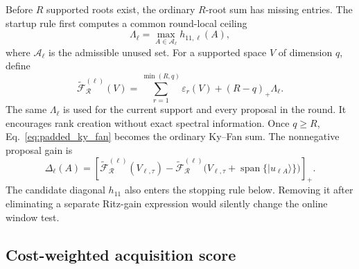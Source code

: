 \documentclass[
  reprint,
  amsmath,
  amssymb,
  aps,
  pra,
  nofootinbib,
  superscriptaddress,
  floatfix
]{revtex4-2}
\newcommand{\ket}[1]{|#1\rangle}
\newcommand{\spanop}{\operatorname{span}}
\newcommand{\mathcalR}{\mathcal{R}}
\begin{document}
Before $R$ supported roots exist, the ordinary $R$-root sum has missing
entries.  The startup rule first computes a common round-local ceiling
\begin{equation}
 \Lambda_\ell=\max_{A\in\mathcal A_\ell}h_{11,\ell}(A),
 \label{eq:rank_filling_ceiling}
\end{equation}
where $\mathcal A_\ell$ is the admissible unused set.  For a supported space
$V$ of dimension $q$, define
\begin{equation}
 \widetilde{\mathcal F}_{\mathcalR}^{(\ell)}(V)
 =\sum_{r=1}^{\min(R,q)}\varepsilon_r(V)
 +(R-q)_+\Lambda_\ell.
 \label{eq:padded_ky_fan}
\end{equation}
The same $\Lambda_\ell$ is used for the current support and every proposal in
the round.  It encourages rank creation without exact spectral information.
Once $q\geq R$, Eq.~\eqref{eq:padded_ky_fan} becomes the ordinary Ky--Fan
sum.  The nonnegative proposal gain is
\begin{equation}
 \Delta_\ell(A)=\left[
 \widetilde{\mathcal F}_{\mathcalR}^{(\ell)}(V_{\ell,\tau})
 -\widetilde{\mathcal F}_{\mathcalR}^{(\ell)}
 \bigl(V_{\ell,\tau}+\spanop\{\ket{u_{\ell A}}\}\bigr)
 \right]_+.
 \label{eq:proposed_pencil_gain}
\end{equation}
The candidate diagonal $h_{11}$ also enters the stopping rule below.  Removing
it after eliminating a separate Ritz-gain expression would silently change
the online window test.

\subsection{Cost-weighted acquisition score}
\label{sec:acquisition_score}
\end{document}

